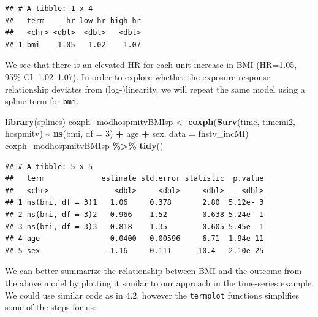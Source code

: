 \documentclass[
]{book}
\newenvironment{Shaded}{\begin{snugshade}}{\end{snugshade}}
\newcommand{\AttributeTok}[1]{\textcolor[rgb]{0.13,0.29,0.53}{#1}}
\newcommand{\DecValTok}[1]{\textcolor[rgb]{0.00,0.00,0.81}{#1}}
\newcommand{\FunctionTok}[1]{\textcolor[rgb]{0.13,0.29,0.53}{\textbf{#1}}}
\newcommand{\NormalTok}[1]{#1}
\newcommand{\OtherTok}[1]{\textcolor[rgb]{0.56,0.35,0.01}{#1}}
\newcommand{\SpecialCharTok}[1]{\textcolor[rgb]{0.81,0.36,0.00}{\textbf{#1}}}
\begin{document}
\begin{verbatim}
## # A tibble: 1 x 4
##   term     hr low_hr high_hr
##   <chr> <dbl>  <dbl>   <dbl>
## 1 bmi    1.05   1.02    1.07
\end{verbatim}

We see that there is an elevated HR for each unit increase in BMI (HR=1.05, 95\% CI: 1.02--1.07). In order to explore whether the exposure-response relationship deviates from (log-)linearity, we will repeat the same model using a spline term for \texttt{bmi}.

\begin{Shaded}
\begin{Highlighting}[]
\FunctionTok{library}\NormalTok{(splines)}
\NormalTok{coxph\_modhospmitvBMIsp }\OtherTok{\textless{}{-}} \FunctionTok{coxph}\NormalTok{(}\FunctionTok{Surv}\NormalTok{(time, timemi2, hospmitv) }\SpecialCharTok{\textasciitilde{}} 
                                  \FunctionTok{ns}\NormalTok{(bmi, }\AttributeTok{df =} \DecValTok{3}\NormalTok{) }\SpecialCharTok{+}\NormalTok{ age }\SpecialCharTok{+}\NormalTok{ sex, }
                                \AttributeTok{data =}\NormalTok{ fhstv\_incMI)}
\NormalTok{coxph\_modhospmitvBMIsp }\SpecialCharTok{\%\textgreater{}\%}
  \FunctionTok{tidy}\NormalTok{()}
\end{Highlighting}
\end{Shaded}

\begin{verbatim}
## # A tibble: 5 x 5
##   term             estimate std.error statistic  p.value
##   <chr>               <dbl>     <dbl>     <dbl>    <dbl>
## 1 ns(bmi, df = 3)1   1.06     0.378       2.80  5.12e- 3
## 2 ns(bmi, df = 3)2   0.966    1.52        0.638 5.24e- 1
## 3 ns(bmi, df = 3)3   0.818    1.35        0.605 5.45e- 1
## 4 age                0.0400   0.00596     6.71  1.94e-11
## 5 sex               -1.16     0.111     -10.4   2.10e-25
\end{verbatim}

We can better summarize the relationship between BMI and the outcome from the above model by plotting it similar to our approach in the time-series example. We could use similar code as in 4.2, however the \texttt{termplot} functions simplifies some of the steps for us:
\end{document}
